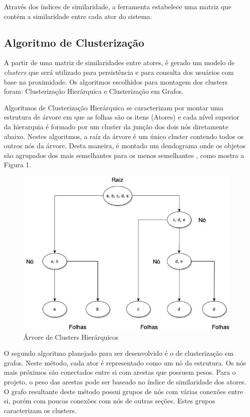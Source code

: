 \documentclass[
	12pt,				%
    oneside,			%
	a4paper,			%
	english,			%
	french,				%
	spanish,			%
	brazil,				%
	]{abntex2}
\begin{document}
Através dos índices de similaridade, a ferramenta estabelece uma matriz que contém a similaridade entre cada ator do sistema.

\subsection{Algoritmo de Clusterização}
A partir de uma matriz de similaridades entre atores, é gerado um modelo de \textit{clusters} que será utilizado para persistência e para consulta dos usuários com base na proximidade. Os algoritmos escolhidos para montagem dos clusters foram: 
Clusterização Hierárquica e Clusterização em Grafos. 

Algoritmos de Clusterização Hierárquica se caracterizam por montar uma estrutura de árvore em que as folhas são os itens (Atores) e cada nível superior da hierarquia é formado por um cluster da junção dos dois nós diretamente abaixo. Nestes algoritmos, a raíz da árvore é um
único cluster contendo todos os outros nós da árvore. Desta maneira, é montado um dendograma onde os objetos são agrupados dos mais semelhantes para os menos semelhantes \cite{10-HierarchicalClusteringAnalysis}, como mostra a Figura 1.

\begin{figure}[hbt]
	\label{fig1:HierarchicalCluster}
	\caption{Árvore de Clusters Hierárquicos}
	\includegraphics[width=160mm]{hierarquical-clustering-01.png}
\end{figure}

O segundo algoritmo planejado para ser desenvolvido é o de clusterização em grafos. Neste método, cada ator é representado como um nó da estrutura. Os nós mais próximos são conectados entre si com arestas que possuem pesos. Para o projeto, o peso das
arestas pode ser baseado no índice de similaridade dos atores. O grafo resultante deste método possui grupos de nós com várias conexões entre si, porém com poucas conexões com nós de outras seções. Estes grupos caracterizam os clusters.
\end{document}
